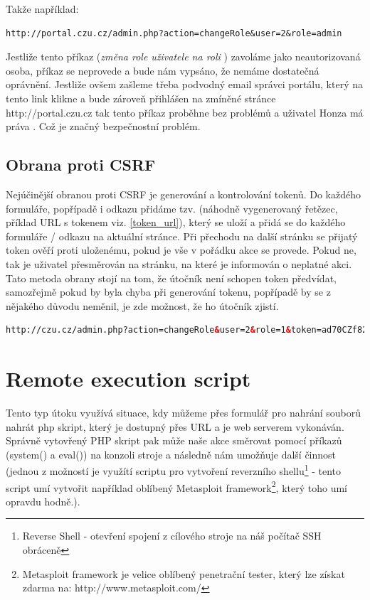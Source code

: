 \documentclass[12pt, a4paper]{report}
\begin{document}
Takže například:
\begin{lstlisting}[label=csfr_example1,caption=URL změny uživatelské role]
http://portal.czu.cz/admin.php?action=changeRole&user=2&role=admin
\end{lstlisting}

Jestliže tento příkaz (\textit{změna role uživatele  na roli }) zavoláme jako neautorizovaná osoba, příkaz se neprovede a bude nám vypsáno, že nemáme dostatečná oprávnění. Jestliže ovšem zašleme třeba podvodný email správci portálu, který na tento link klikne a bude zároveň přihlášen na zmíněné stránce {http://portal.czu.cz} tak tento příkaz proběhne bez problémů a uživatel Honza má práva . Což je značný bezpečnostní problém.

\subsection{Obrana proti CSRF}
Nejúčinější obranou proti CSRF je generování a kontrolování tokenů. Do každého formuláře, popřípadě i odkazu přidáme tzv.  (náhodně vygenerovaný řetězec, příklad URL s tokenem viz. \ref{token_url}), který se uloží a přidá se do každého formuláře / odkazu na aktuální stránce. Při přechodu na další stránku se přijatý token ověří proti uloženému, pokud je vše v pořádku akce se provede. Pokud ne, tak je uživatel přesměrován na  stránku, na které je informován o neplatné akci. Tato metoda obrany stojí na tom, že útočník není schopen token předvídat, samozřejmě pokud by byla chyba při generování tokenu, popřípadě by se z nějakého důvodu neměnil, je zde možnost, že ho útočník zjistí.

\begin{lstlisting}[label=token_url,language=HTML, caption=CSRF obrana - token]
http://czu.cz/admin.php?action=changeRole&user=2&role=1&token=ad70CZf82
\end{lstlisting}

\section{Remote execution script}
Tento typ útoku využívá situace, kdy můžeme přes formulář pro nahrání souborů nahrát php skript, který je dostupný přes URL a je web serverem vykonáván. Správně vytovřený PHP skript pak může naše akce směrovat pomocí příkazů (system() a eval()) na konzoli stroje a následně nám umožňuje další činnost (jednou z možností je využítí scriptu pro vytvoření reverzního shellu\footnote{Reverse Shell - otevření spojení z cílového stroje na náš počítač  SSH obráceně} - tento script umí vytvořit například oblíbený Metasploit framework\footnote{Metasploit framework je velice oblíbený penetrační tester, který lze získat zdarma na: http://www.metasploit.com/}, který toho umí opravdu hodně.).
\end{document}
